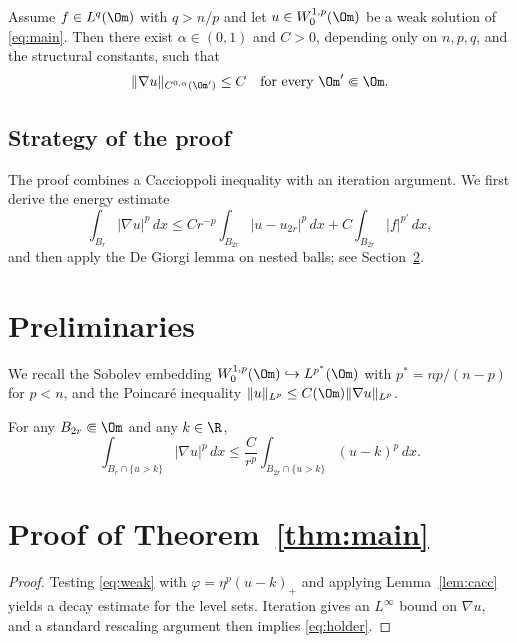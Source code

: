 \begin{theorem}\label{thm:main}
Assume $f\in L^q(\Om)$ with $q>n/p$ and let $u\in W^{1,p}_0(\Om)$ be a weak
solution of \eqref{eq:main}. Then there exist $\alpha\in(0,1)$ and $C>0$,
depending only on $n,p,q$, and the structural constants, such that
\begin{equation}\label{eq:holder}
  \|\nabla u\|_{C^{0,\alpha}(\Om')} \le C
  \quad\text{for every } \Om'\Subset\Om .
\end{equation}
\end{theorem}

\subsection{Strategy of the proof}
The proof combines a Caccioppoli inequality with an iteration argument.
We first derive the energy estimate
\begin{equation}
  \int_{B_r} |\nabla u|^p\,dx
  \le C r^{-p}\int_{B_{2r}} |u-u_{2r}|^p\,dx + C\int_{B_{2r}}|f|^{p'}\,dx ,
\end{equation}
and then apply the De Giorgi lemma on nested balls; see
Section~\ref{sec:proof}.

\section{Preliminaries}\label{sec:pre}

We recall the Sobolev embedding $W^{1,p}_0(\Om)\hookrightarrow L^{p^*}(\Om)$
with $p^*=np/(n-p)$ for $p<n$, and the Poincaré inequality
$\|u\|_{L^p}\le C(\Om)\|\nabla u\|_{L^p}$.

\begin{lemma}[Caccioppoli]\label{lem:cacc}
For any $B_{2r}\Subset\Om$ and any $k\in\R$,
\begin{equation}
  \int_{B_r\cap\{u>k\}}|\nabla u|^p\,dx
  \le \frac{C}{r^p}\int_{B_{2r}\cap\{u>k\}}(u-k)^p\,dx .
\end{equation}
\end{lemma}

\section{Proof of Theorem~\ref{thm:main}}\label{sec:proof}

\begin{proof}[Proof]
Testing \eqref{eq:weak} with $\varphi=\eta^p(u-k)_+$ and applying
Lemma~\ref{lem:cacc} yields a decay estimate for the level sets.
Iteration gives an $L^\infty$ bound on $\nabla u$, and a standard
rescaling argument then implies \eqref{eq:holder}.
\end{proof}


